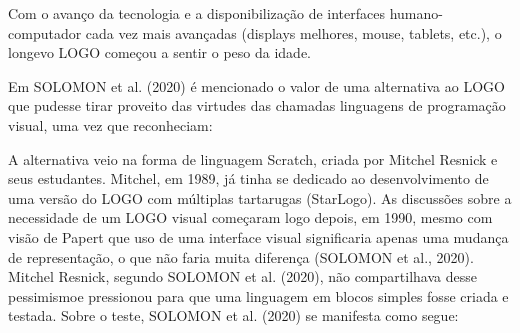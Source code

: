 \documentclass[
12pt,		%
openright,	%
twoside,  %
a4paper,			%
chapter=TITLE,		%
english,			%
french,				%
spanish,			%
brazil				%
]{USPSC-classe/USPSC}
\begin{document}
Com o avan\c{c}o da tecnologia e a disponibiliza\c{c}\~ao de interfaces humano-computador cada vez mais avan\c{c}adas (displays melhores, mouse, tablets, etc.), o longevo LOGO come\c{c}ou a sentir o peso da idade.









Em SOLOMON et al. (2020) \'e mencionado o valor de uma alternativa ao LOGO que pudesse tirar proveito das virtudes das chamadas \textquotedbl linguagens de programa\c{c}\~ao visual\textquotedbl , uma vez que reconheciam:










\noindent\begin{center}\mbox{\centering{}}\end{center}


A alternativa veio na forma de linguagem Scratch, criada por Mitchel Resnick e seus estudantes. Mitchel, em 1989, j\'a tinha se dedicado ao desenvolvimento de uma vers\~ao do LOGO com m\'ultiplas tartarugas (StarLogo). As discuss\~oes sobre a necessidade de um LOGO visual come\c{c}aram logo depois, em 1990, mesmo com vis\~ao de Papert que uso de uma interface visual significaria apenas uma mudan\c{c}a de representa\c{c}\~ao, o que n\~ao faria muita diferen\c{c}a   (SOLOMON et al., 2020). Mitchel Resnick, segundo  SOLOMON et al. (2020), \textquotedbl n\~ao compartilhava desse pessimismo\textquotedbl  e pressionou para que uma linguagem em blocos simples fosse criada e testada. Sobre o teste,  SOLOMON et al. (2020) se manifesta como segue:










\noindent\begin{center}\mbox{\centering{}}\end{center}
\end{document}
